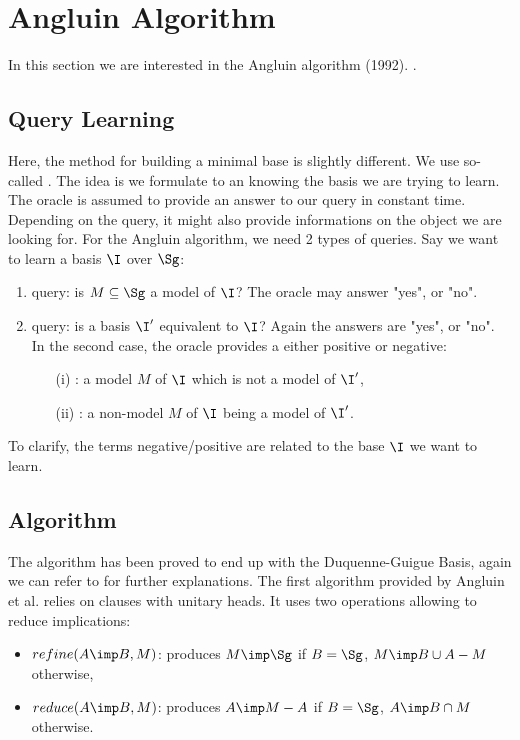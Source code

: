 \section{Angluin Algorithm}

In this section we are interested in the Angluin algorithm (1992). 
\cite{angluin_learning_1992, arias_canonical_2009}.

\subsection{Query Learning}

Here, the method for building a minimal base is slightly different. We use 
so-called . The idea is we formulate 
to an  knowing the basis we are trying to learn. The oracle 
is assumed to provide an answer to our query in constant time. Depending on 
the query, it might also provide informations on the object we are looking for.
For the Angluin algorithm, we need 2 types of queries. Say we want to learn
a basis $\I$ over $\Sg$:
\begin{enumerate}
	\item {} query: is $M \subseteq \Sg$ a model of $\I$? The
	oracle may answer "yes", or "no".
	\item {} query: is a basis $\I'$ equivalent to $\I$? Again
	the answers are "yes", or "no". In the second case, the oracle provides a
	 either positive or negative:
		\begin{itemize}
			\item[(i)] : a model $M$ of $\I$ which is not a
			model of $\I'$,
			\item[(ii)] : a non-model $M$ of $\I$ being a model
			of $\I'$. 
		\end{itemize}
\end{enumerate}
\noindent To clarify, the terms negative/positive are related to the base $\I$
we want to learn.

\subsection{Algorithm}

The algorithm has been proved to end up with the Duquenne-Guigue Basis, again 
we can refer to \cite{angluin_learning_1992, arias_canonical_2009} for further
explanations. The first algorithm provided by Angluin et al. relies on clauses
with unitary heads. It uses two operations allowing to reduce implications:
\begin{itemize}
	\item $refine(A \imp B, M)$: produces $M \imp \Sg$ if $B = \Sg$, 
	$M \imp B \cup A - M$ otherwise,
	\item $reduce(A \imp B, M)$: produces $A \imp M - A$ if $B = \Sg$, 
	$A \imp B \cap M$ otherwise.
\end{itemize}

